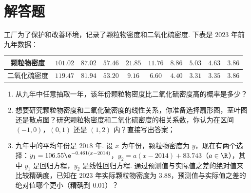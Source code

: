 \section{解答题}

\begin{problem}
工厂为了保护和改善环境，记录了颗粒物密度和二氧化硫密度. 下表是 \( 2023 \) 年前九年数据：

\begin{center}
\renewcommand{\arraystretch}{1.25}
\begin{tabular}{|c|c|c|c|c|c|c|c|c|c|}
\hline
颗粒物密度 & \(101.02\) & \(87.02\) & \(57.46\) & \(21.85\) & \(11.76\) & \(8.86\) & \(5.03\) & \(4.63\) & \(3.86\) \\
\hline
二氧化硫密度 & \(119.47\) & \(81.94\) & \(53.20\) & \(9.16\) & \(6.60\) & \(4.40\) & \(3.31\) & \(3.35\) & \(3.86\) \\
\hline
\end{tabular}
\end{center}

\begin{enumerate}
\item 从九年中任意抽取一年，该年份颗粒物密度比二氧化硫密度高的概率是多少？
\item 想要研究颗粒物密度和二氧化硫密度的线性关系，你准备选择扇形图，茎叶图还是散点图？研究颗粒物密度和二氧化硫密度的相关系数，你认为在区间 \((-1,0)\)，\((0,1)\) 还是 \((1,2)\) 内？直接写出答案；
\item 九年中的平均年份是 \( 2018 \) 年. 设 \( x \) 为年份，颗粒物密度为 \( y \)，现在有两个选择：\( y_1=106.55\e^{-0.461\left( x-2014 \right)} \)，\( y_2=a\left( x-2014 \right)+83.743 \)（\( a\in\R \)），其中 \( y_1 \) 是回归方程，\( y_2 \) 是线性回归方程. 通过预测值与实际值之差的绝对值来比较精确度，已知在 \( 2023 \) 年实际颗粒物密度为 \( 3.88 \)，预测值与实际值之差的绝对值哪个更小（精确到 \( 0.01 \)）？
\end{enumerate}
\end{problem}

